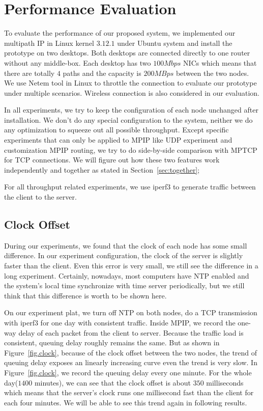 \section{Performance Evaluation}
\label{sec:evaluation}

To evaluate the performance of our proposed system, we implemented our multipath IP in Linux kernel $3.12.1$ under Ubuntu system and install the prototype on two desktops. Both desktops are connected directly to one router without any middle-box. Each desktop has two $100Mbps$ NICs which means that there are totally $4$ paths and the capacity is $200MBps$ between the two nodes. We use Netem tool in Linux to throttle the connection to evaluate our prototype under multiple scenarios. Wireless connection is also considered in our evaluation.

In all experiments, we try to keep the configuration of each node unchanged after installation. We don't do any special configuration to the system, neither we do any optimization to squeeze out all possible throughput. Except specific experiments that can only be applied to MPIP like UDP experiment and customization MPIP routing, we try to do side-by-side comparison with MPTCP for TCP connections. We will figure out how these two features work independently and together as stated in Section~\ref{sec:together};

For all throughput related experiments, we use iperf3 to generate traffic between the client to the server.


\subsection{Clock Offset}
\label{sec:clock}

During our experiments, we found that the clock of each node has some small difference. In our experiment configuration, the clock of the server is slightly faster than the client. Even this error is very small, we still see the difference in a long experiment.
Certainly, nowadays, most computers have NTP enabled and the system's local time synchronize with time server periodically, but we still think that this difference is worth to be shown here.

On our experiment plat, we turn off NTP on both nodes, do a TCP transmission with iperf3 for one day with consistent traffic. Inside MPIP, we record the one-way delay of each packet from the client to server. Because the traffic load is consistent, queuing delay roughly remains the same. But as shown in Figure~\ref{fig.clock}, because of the clock offset between the two nodes, the trend of queuing delay exposes an linearly increasing curve even the trend is very slow. In Figure~\ref{fig.clock}, we record the queuing delay every one minute. For the whole day($1400$ minutes), we can see that the clock offset is about $350$ milliseconds which means that the server's clock runs one millisecond fast than the client for each four minutes. We will be able to see this trend again in following results.

